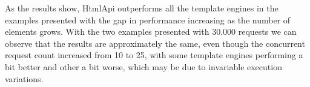 \noindent
As the results show, HtmlApi outperforms all the template engines in the examples presented with the gap in performance increasing as the number of elements grows. With the two examples presented with 30.000 requests we can observe that the results are approximately the same, even though the concurrent request count increased from 10 to 25, with some template engines performing a bit better and other a bit worse, which may be due to invariable execution variations.

% 
% 
% 
% 
% 
% 
% 
% 


